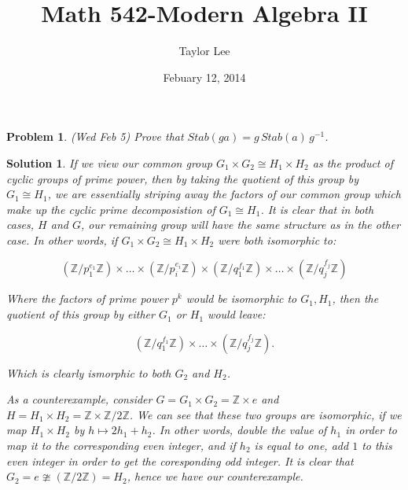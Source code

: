 \documentclass[12pt]{article}
\theoremstyle{moo}
\newtheorem*{prob}{Problem}
\newtheorem*{sol}{Solution}
\def\zz{{\mathbb Z}}
\begin{document}
\fontseries {\seriesdefault}
\fontshape {\shapedefault}
\selectfont

\title{ Math 542-Modern Algebra II}
\date{Febuary 12, 2014}         %
\author{Taylor Lee}      %
\maketitle                      %

\begin{prob}
(Wed Feb 5) Prove that $Stab(ga)=g\,Stab(a)\,g^{-1}$.
\end{prob}



\begin{sol}
If we view our common group $G_1 \times G_2 \cong H_1 \times H_2$ as the product of cyclic groups of prime power, then by taking the quotient of this group by $G_1\cong H_1$, we are essentially striping away the factors of our common group which make up the cyclic prime decomposistion of $G_1\cong H_1$. It is clear that in both cases, $H$ and $G$, our remaining group will have the same structure as in the other case. In other words, if $G_1 \times G_2 \cong H_1 \times H_2$ were both isomorphic to:

\[
( \zz/p_1^{e_1} \zz ) \times \dots \times ( \zz / p_i^{e_i} \zz ) \times (\zz/ q_1^{f_1} \zz) \times \dots \times (\zz / q_j^{f_j} \zz)
\]

Where the factors of prime power $p^k$ would be isomorphic to $G_1, H_1$, then the quotient of this group by either $G_1$ or  $H_1$ would leave:

\[
(\zz/q_1^{f_1} \zz) \times \dots \times (\zz / q_j^{f_j} \zz).
\]

Which is clearly ismorphic to both $G_2$ and $H_2$.

As a counterexample, consider $G = G_1 \times G_2 = \zz \times {e}$ and $H = H_1 \times H_2 = \zz \times \zz/2\zz$. We can see that these two groups are isomorphic, if we map $H_1 \times H_2 $ by $h \mapsto 2h_1 + h_2$. In other words, double the value of $h_1$ in order to map it to the corresponding even integer, and if $h_2$ is equal to one, add $1$ to this even integer in order to get the coresponding odd integer. It is clear that $G_2 = {e} \ncong (\zz/2\zz) = H_2$, hence we have our counterexample. 
\end{sol}
\end{document}
